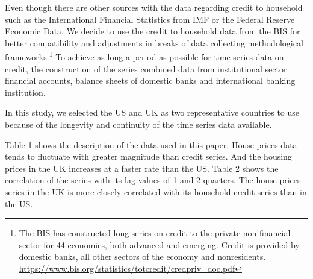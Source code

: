\documentclass[
  12pt,
]{article}
\begin{document}
Even though there are other sources with the data regarding credit to household such as the International Financial Statistics from IMF or the Federal Reserve Economic Data. We decide to use the credit to household data from the BIS for better compatibility and adjustments in breaks of data collecting methodological frameworks.\footnote{The BIS has constructed long series on credit to the private non-financial sector for 44 economies, both advanced and emerging. Credit is provided by domestic banks, all other sectors of the economy and nonresidents. \url{https://www.bis.org/statistics/totcredit/credpriv_doc.pdf}} To achieve as long a period as possible for time series data on credit, the construction of the series combined data from institutional sector financial accounts, balance sheets of domestic banks and international banking institution.

In this study, we selected the US and UK as two representative countries to use because of the longevity and continuity of the time series data available.

Table 1 shows the description of the data used in this paper. House prices data tends to fluctuate with greater magnitude than credit series. And the housing prices in the UK increases at a faster rate than the US. Table 2 shows the correlation of the series with its lag values of 1 and 2 quarters. The house prices series in the UK is more closely correlated with its household credit series than in the US.
\end{document}
